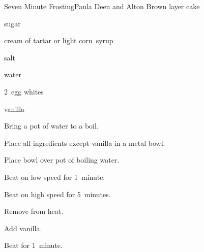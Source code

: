 \begin{recipe}{Seven Minute Frosting}{Paula Deen and Alton Brown}{ layer cake}

\begin{ingredients}
\item \C{1\half} sugar
\item \tp{\quarter} cream of tartar or  light corn~syrup
\item \tp{\eighth} salt
\item \C{\third} water
\item 2~egg whites
\item \tp{1\half} vanilla
\end{ingredients}

\begin{directions}
\item Bring a pot of water to a boil.
\item Place all ingredients except vanilla in a metal bowl.
\item Place bowl over pot of boiling water.
\item Beat on low speed for 1~minute.
\item Beat on high speed for 5~minutes.
\item Remove from heat.
\item Add vanilla.
\item Beat for 1~minute.
\end{directions}

\end{recipe}
